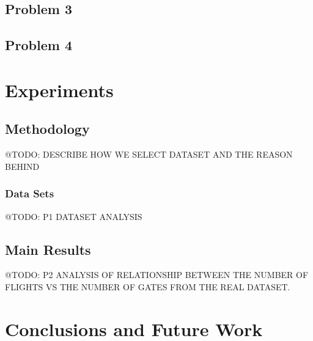 \documentclass[11pt,a4paper]{article}
\begin{document}
\subsection{Problem 3}
\label{subsec:algo-prob3}

\subsection{Problem 4}
\label{subsec:algo-prob4}

\section{Experiments}
\label{sec:expe}

\subsection{Methodology}
\label{subsec:expo-meth}
@TODO: DESCRIBE HOW WE SELECT DATASET AND THE REASON BEHIND

\subsubsection{Data Sets}
\label{subsec:expo-data}
@TODO: P1 DATASET ANALYSIS

\subsection{Main Results}
\label{subsec:expo-resu}
@TODO: P2 ANALYSIS OF RELATIONSHIP BETWEEN THE NUMBER OF FLIGHTS VS THE NUMBER OF GATES FROM THE REAL DATASET.

\section{Conclusions and Future Work}
\label{sec:conc}



\end{document}
